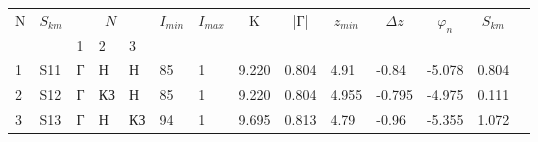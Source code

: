 \begin{tabular}{|l|l|l|l|l|l|l|l|l|l|l|l|l|l}
\cline{1-13}
\multicolumn{1}{|c|}{\multirow{2}{*}{N}} & \multicolumn{1}{c|}{\multirow{2}{*}{$S_{km}$}} & \multicolumn{3}{c|}{$N_{}$} & \multicolumn{1}{c|}{\multirow{2}{*}{$I_{min}$}} & \multicolumn{1}{c|}{\multirow{2}{*}{$I_{max}$}} & \multicolumn{1}{c|}{\multirow{2}{*}{K}} & \multicolumn{1}{c|}{\multirow{2}{*}{|Г|}} & \multicolumn{1}{c|}{\multirow{2}{*}{$z_{min}$}} & \multicolumn{1}{c|}{\multirow{2}{*}{$\Delta z$}} & \multicolumn{1}{c|}{\multirow{2}{*}{$\varphi_n$}} & \multicolumn{1}{c|}{\multirow{2}{*}{$S_{km}$}} &  \\ \cline{3-5}
\multicolumn{1}{|c|}{}                   & \multicolumn{1}{c|}{}                          & 1      & 2       & 3      & \multicolumn{1}{c|}{}                           & \multicolumn{1}{c|}{}                           & \multicolumn{1}{c|}{}                   & \multicolumn{1}{c|}{}                     & \multicolumn{1}{c|}{}                           & \multicolumn{1}{c|}{}                            & \multicolumn{1}{c|}{}                             & \multicolumn{1}{c|}{}                          &  \\ \cline{1-13}
1                                        & S11                                            & Г      & Н       & Н      & 85                                              & 1                                               & 9.220                                   & 0.804                                     & 4.91                                            & -0.84                                            & -5.078                                            & 0.804                                          &  \\ \cline{1-13}
2                                        & S12                                            & Г      & КЗ      & Н      & 85                                              & 1                                               & 9.220                                   & 0.804                                     & 4.955                                           & -0.795                                           & -4.975                                            & 0.111                                          &  \\ \cline{1-13}
3                                        & S13                                            & Г      & Н       & КЗ     & 94                                              & 1                                               & 9.695                                   & 0.813                                     & 4.79                                            & -0.96                                            & -5.355                                            & 1.072                                          &  \\ \cline{1-13}

\end{tabular}
